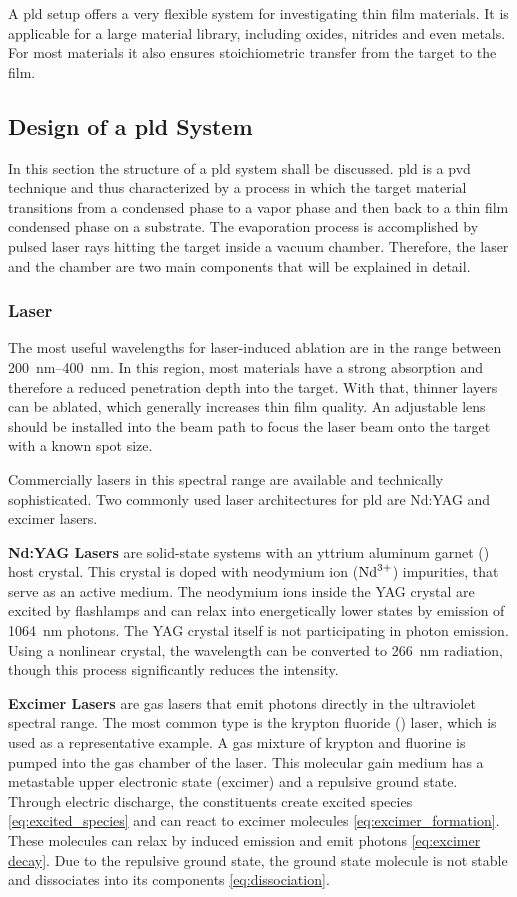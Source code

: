  A \ac{pld} setup offers a very flexible system for investigating thin film materials.
It is applicable for a large material library, including oxides, nitrides and even
metals. 
For most materials it also ensures stoichiometric transfer from the target to the film.

\subsection{Design of a \ac{pld} System}
In this section the structure of a \ac{pld} system shall be discussed.
\ac{pld} is a \ac{pvd} technique and thus characterized by a process in which the target
material transitions from a condensed phase to a vapor phase and then back to a thin 
film condensed phase on a substrate.
The evaporation process is accomplished by pulsed laser rays hitting the target inside
a vacuum chamber. 
Therefore, the laser and the chamber are  two main components that will be
explained in detail.

\subsubsection{Laser}
The most useful wavelengths for laser-induced ablation are in the range between
\qtyrange{200}{400}{\nano \meter}. 
In this region, most materials have a strong absorption and therefore a reduced 
penetration depth into the target. 
With that, thinner layers can be ablated, which generally increases thin film quality.
An adjustable lens should be installed into the beam path to focus the laser beam onto 
the target with a known spot size.

Commercially lasers in this spectral range are available and technically sophisticated.
Two commonly used laser architectures for \ac{pld} are Nd:YAG and excimer lasers.

\textbf{Nd:YAG Lasers}
are solid-state systems with an yttrium aluminum garnet () host
crystal.
This crystal is doped with neodymium ion ($\ce{Nd^{{3+}}}$) impurities, that serve as an
active medium.
The neodymium ions inside the YAG crystal are excited by flashlamps and can 
relax into energetically lower states by emission of \qty{1064}{\nano\meter} photons. 
The YAG crystal itself is not participating in photon emission.
Using a nonlinear crystal, the wavelength can be converted to \qty{266}{\nano\meter} 
radiation, though this process significantly reduces the intensity.

\textbf{Excimer Lasers} are gas lasers that emit photons directly in the ultraviolet 
spectral range.
The most common type is the krypton fluoride () laser, which is used as 
a representative example. 
A gas mixture of krypton and fluorine is pumped into the gas chamber of the laser.
This molecular gain medium has a metastable upper electronic state (excimer) 
and a repulsive ground state.
Through electric discharge, the constituents create excited species 
\cref{eq:excited_species} and can react to excimer molecules \cref{eq:excimer_formation}.
These molecules can relax by induced emission and emit photons \cref{eq:excimer decay}.
Due to the repulsive ground state, the ground state molecule is not stable and
dissociates into its components \cref{eq:dissociation}.

